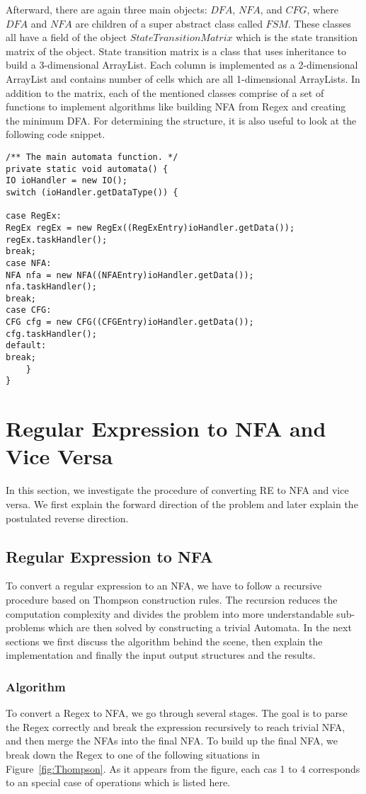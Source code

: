 \documentclass[
12pt, %
a4paper, %
oneside, %
headinclude,footinclude, %
BCOR5mm, %
]{scrartcl}
\begin{document}
Afterward, there are again three main objects: $DFA$, $NFA$, and $CFG$, where $DFA$ and $NFA$ are children of a super abstract class called $FSM$. These classes all have a field of the object $StateTransitionMatrix$ which is the state transition matrix of the object. State transition matrix is a class that uses inheritance to build a 3-dimensional ArrayList. Each column is implemented as a 2-dimensional ArrayList and contains number of cells which are all 1-dimensional ArrayLists. In addition to the matrix, each of the mentioned classes comprise of a set of functions to implement algorithms like building NFA from Regex and creating the minimum DFA. For determining the structure, it is also useful to look at the following code snippet. 
\begin{lstlisting}
/** The main automata function. */
private static void automata() {
IO ioHandler = new IO();
switch (ioHandler.getDataType()) {

case RegEx:
RegEx regEx = new RegEx((RegExEntry)ioHandler.getData());
regEx.taskHandler();
break;
case NFA:
NFA nfa = new NFA((NFAEntry)ioHandler.getData());
nfa.taskHandler();
break;
case CFG: 
CFG cfg = new CFG((CFGEntry)ioHandler.getData());
cfg.taskHandler();
default:
break;
	}
}
\end{lstlisting}


\newpage
\section{Regular Expression to NFA and Vice Versa}
In this section, we investigate the procedure of converting RE to NFA and vice versa. We first explain the forward direction of the problem and later explain the postulated reverse direction.
\subsection{Regular Expression to NFA}
To convert a regular expression to an NFA, we have to follow a recursive procedure based on Thompson construction rules. The recursion reduces the computation complexity and divides the problem into more understandable sub-problems which are then solved by constructing a trivial Automata. In the next sections we first discuss the algorithm behind the scene, then explain the implementation and finally the input output structures and the results.
\subsubsection{Algorithm}
To convert a Regex to NFA, we go through several stages. The goal is to parse the Regex correctly and break the expression recursively to reach trivial NFA, and then merge the NFAs into the final NFA. To build up the final NFA, we break down the Regex to one of the following situations in Figure~\vref{fig:Thompson}. As it appears from the figure, each cas 1 to 4 corresponds to an special case of operations which is listed here.
\end{document}
